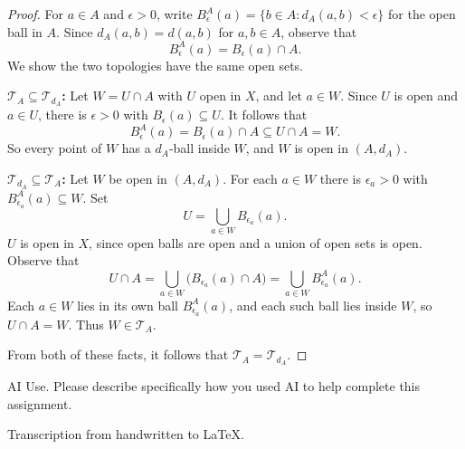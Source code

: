 \documentclass[minion]{homework}
\begin{document}
\begin{problems}
\begin{proof}
For $a \in A$ and $\epsilon > 0$, write $B^A_\epsilon(a) = \{b \in A : d_A(a,b) < \epsilon\}$ for the open ball in $A$. Since $d_A(a,b) = d(a,b)$ for $a, b \in A$, observe that
\[
B^A_\epsilon(a) = B_\epsilon(a) \cap A.
\]
We show the two topologies have the same open sets.

\textbf{$\mathcal{T}_A \subseteq \mathcal{T}_{d_A}$:} Let $W = U \cap A$ with $U$ open in $X$, and let $a \in W$. Since $U$ is open and $a \in U$, there is $\epsilon > 0$ with $B_\epsilon(a) \subseteq U$. It follows that
\[
B^A_\epsilon(a) = B_\epsilon(a) \cap A \subseteq U \cap A = W.
\]
So every point of $W$ has a $d_A$-ball inside $W$, and $W$ is open in $(A, d_A)$.

\textbf{$\mathcal{T}_{d_A} \subseteq \mathcal{T}_A$:} Let $W$ be open in $(A, d_A)$. For each $a \in W$ there is $\epsilon_a > 0$ with $B^A_{\epsilon_a}(a) \subseteq W$. Set
\[
U = \bigcup_{a \in W} B_{\epsilon_a}(a).
\]
$U$ is open in $X$, since open balls are open and a union of open sets is open. Observe that
\[
U \cap A = \bigcup_{a \in W} \big(B_{\epsilon_a}(a) \cap A\big) = \bigcup_{a \in W} B^A_{\epsilon_a}(a).
\]
Each $a \in W$ lies in its own ball $B^A_{\epsilon_a}(a)$, and each such ball lies inside $W$, so $U \cap A = W$. Thus $W \in \mathcal{T}_A$.

From both of these facts, it follows that $\mathcal{T}_A = \mathcal{T}_{d_A}$.
\end{proof}

\problem AI Use. Please describe specifically how you used AI to help complete this assignment.

Transcription from handwritten to LaTeX.

\end{problems}
\end{document}
